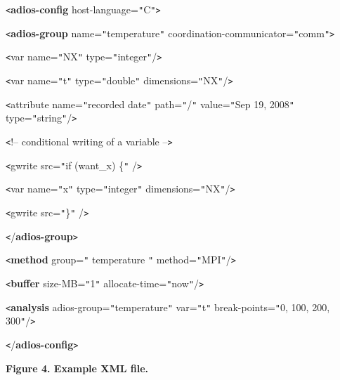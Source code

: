 \vspace{22pt}
\texttt{<}\textbf{adios-config} host-language=\texttt{"}C\texttt{"}\texttt{>}

\vspace{22pt}
\parindent=14pt
\texttt{<}\textbf{adios-group} name=\texttt{"}temperature\texttt{"} coordination-communicator=\texttt{"}comm\texttt{"}\texttt{>}

\vspace{10pt}
\parindent=28pt
\texttt{<}var name=\texttt{"}NX\texttt{"} type=\texttt{"}integer\texttt{"}/\texttt{>}

\vspace{10pt}
\texttt{<}var name=\texttt{"}t\texttt{"} type=\texttt{"}double\texttt{"} dimensions=\texttt{"}NX\texttt{"}/\texttt{>}

\vspace{10pt}
\parindent=57pt
\texttt{<}attribute name=\texttt{"}recorded date\texttt{"} path=\texttt{"}/\texttt{"} 
value=\texttt{"}Sep 19, 2008\texttt{"} type=\texttt{"}string\texttt{"}/\texttt{>}

\vspace{22pt}
\parindent=28pt
{\color{color26} \texttt{<}!-- conditional writing of a variable --\texttt{>}}

\vspace{10pt}
\parindent=0pt
\texttt{<}gwrite src=\texttt{"}if (want\_x) \{\texttt{"} /\texttt{>}

\vspace{10pt}
\parindent=43pt
\texttt{<}var name=\texttt{"}x\texttt{"} type=\texttt{"}integer\texttt{"} dimensions=\texttt{"}NX\texttt{"}/\texttt{>}

\vspace{10pt}
\parindent=0pt
\texttt{<}gwrite src=\texttt{"}\}\texttt{"} /\texttt{>}

\vspace{22pt}
\parindent=14pt
\texttt{<}/\textbf{adios-group}\texttt{>}

\vspace{22pt}
\texttt{<}\textbf{method} group=\texttt{"} temperature \texttt{"} method=\texttt{"}MPI\texttt{"}/\texttt{>}

\vspace{22pt}
\texttt{<}\textbf{buffer} size-MB=\texttt{"}1\texttt{"} allocate-time=\texttt{"}now\texttt{"}/\texttt{>}

\vspace{10pt}
\texttt{<}\textbf{analysis }adios-group=\texttt{"}temperature\texttt{"} var=\texttt{"}t\texttt{"} 
break-points=\texttt{"}0, 100, 200, 300\texttt{"}/\texttt{>}

\vspace{22pt}
\parindent=0pt
\texttt{<}/\textbf{adios-config}\texttt{>}

\label{HRef119578444}\label{HToc144350163}

\vspace{22pt}
\leftskip=18pt
{\color{color20} \textbf{Figure 4. Example XML file.\label{HToc84890255}\label{HToc212016631}\label{HToc212016873}\label{HRef212367123}\label{HToc82067526}\label{HRef278374025}\label{HRef278895952}\label{HToc182553379}}}

